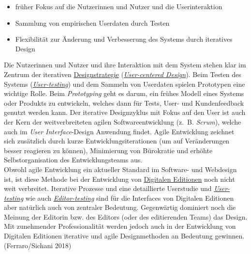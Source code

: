 \documentclass{article}
\begin{document}
        \begin{itemize}\item {früher Fokus auf die Nutzerinnen und Nutzer und die Userinteraktion}\item {Sammlung von empirischen Userdaten durch Testen}\item {Flexibilität zur Änderung und Verbesserung des Systems durch iteratives
                     Design }\end{itemize}Die Nutzerinnen und Nutzer und ihre Interaktion mit dem System stehen klar im
                  Zentrum der iterativen \href{http://gams.uni-graz.at/o:konde.56}{Designstrategie} (\emph{\href{http://gams.uni-graz.at/o:konde.207}{User-centered Design}}). Beim Testen des Systems (\emph{\href{http://gams.uni-graz.at/o:konde.206}{User-testing}}) und dem Sammeln von Userdaten spielen Prototypen eine wichtige Rolle. Beim
                     \emph{
                     Prototyping
                  } geht es darum, ein frühes Modell eines Systems oder Produkts zu entwickeln,
                  welches dann für Tests, User- und Kundenfeedback genutzt werden kann. Der
                  iterative Designzyklus mit Fokus auf den User ist auch der Kern der
                  weitverbreiteten agilen Softwareentwicklung (z. B. \emph{Scrum}),
                  welche auch im \emph{User Interface}-Design Anwendung findet.
                  Agile Entwicklung zeichnet sich zusätzlich durch kurze Entwicklungsiterationen (um
                  auf Veränderungen besser reagieren zu können), Minimierung von Bürokratie und
                  erhöhte Selbstorganisation des Entwicklungsteams aus. \\
            
        Obwohl agile Entwicklung ein aktueller Standard im Software- und Webdesign ist,
                  ist diese Methode bei der Entwicklung von \href{http://gams.uni-graz.at/o:konde.59}{Digitalen Editionen} noch nicht weit verbreitet.
                  Iterative Prozesse und eine detaillierte Userstudie und \emph{\href{http://gams.uni-graz.at/o:konde.206}{User-testing}} wie auch \emph{\href{http://gams.uni-graz.at/o:konde.78}{Editor-testing}} sind für die Interfaces von Digitalen Editionen aber natürlich auch von
                  zentraler Bedeutung. Gegenwärtig dominiert noch die Meinung der Editorin bzw. des
                  Editors (oder des editierenden Teams) das Design. Mit zunehmender Professionalität
                  werden jedoch auch in der Entwicklung von Digitalen Editionen iterative und agile
                  Designmethoden an Bedeutung gewinnen. (Ferraro/Sichani 2018)\\
            
\end{document}
